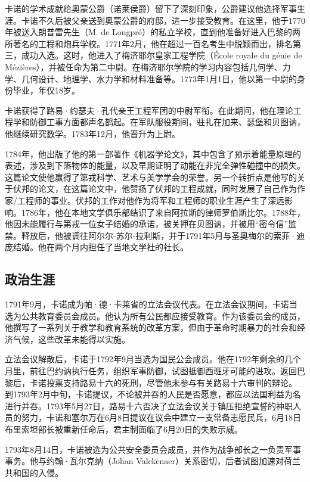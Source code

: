 卡诺的学术成就给奥蒙公爵（诺莱侯爵）留下了深刻印象，公爵建议他选择军事生涯。卡诺不久后被父亲送到奥蒙公爵的府邸，进一步接受教育。在这里，他于1770年被送入朗普雷先生（M. de Longpré）的私立学校，直到他准备好进入巴黎的两所著名的工程和炮兵学校。1771年2月，他在超过一百名考生中脱颖而出，排名第三，成功入选。这时，他进入了梅济耶尔皇家工程学院（École royale du génie de Mézières），并被任命为第二中尉。在梅济耶尔学院的学习内容包括几何学、力学、几何设计、地理学、水力学和材料准备等。1773年1月1日，他以第一中尉的身份毕业，年仅18岁。

卡诺获得了路易·约瑟夫·孔代亲王工程军团的中尉军衔。在此期间，他在理论工程学和防御工事方面都声名鹊起。在军队服役期间，驻扎在加来、瑟堡和贝图讷，他继续研究数学。1783年12月，他晋升为上尉。

1784年，他出版了他的第一部著作《机器学论文》，其中包含了预示着能量原理的表述，涉及到下落物体的能量，以及早期证明了动能在非完全弹性碰撞中的损失。这篇论文使他赢得了第戎科学、艺术与美学学会的荣誉。另一个转折点是他写的关于伏邦的论文，在这篇论文中，他赞扬了伏邦的工程成就，同时发展了自己作为作家/工程师的事业。伏邦的工作对他作为将军和工程师的职业生涯产生了深远影响。1786年，他在本地文学俱乐部结识了来自阿拉斯的律师罗伯斯比尔。1788年，他因未能履行与第戎一位女子结婚的承诺，被关押在贝图讷，并被用“密令信”监禁。释放后，他被调往阿尔尔-苏尔-拉利斯，并于1791年5月与圣奥梅尔的索菲·迪庞结婚。他在两个月内担任了当地文学社的社长。
\subsection{政治生涯}  
1791年9月，卡诺成为帕·德·卡莱省的立法会议代表。在立法会议期间，卡诺当选为公共教育委员会成员。他认为所有公民都应接受教育。作为该委员会的成员，他撰写了一系列关于教学和教育系统的改革方案，但由于革命时期暴力的社会和经济气候，这些改革未能得以实施。

立法会议解散后，卡诺于1792年9月当选为国民公会成员。他在1792年剩余的几个月里，前往巴约讷执行任务，组织军事防御，试图抵御西班牙可能的进攻。返回巴黎后，卡诺投票支持路易十六的死刑，尽管他未参与有关路易十六审判的辩论。  
到1793年2月中旬，卡诺提议，不论被并吞的人民是否愿意，都应以法国利益为名进行并吞。1793年5月27日，路易十六否决了立法会议关于镇压拒绝宣誓的神职人员的努力，卡诺和塞尔万在6月8日提议在议会中建立一支常备志愿民兵，6月18日布里索坦部长被重新任命后，君主制面临了6月20日的失败示威。

1793年8月14日，卡诺被选为公共安全委员会成员，并作为战争部长之一负责军事事务。他与约翰·瓦尔克纳（Johan Valckenaer）关系密切，后者试图加速对荷兰共和国的入侵。

